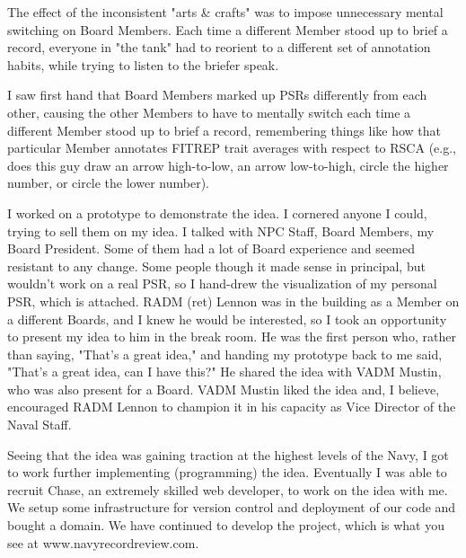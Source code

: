 \documentclass[UTF8]{article}
\begin{document}
The effect of the inconsistent "arts \& crafts" was to impose unnecessary mental 
switching on Board Members. Each time a different Member stood up to brief a record,
everyone in "the tank" had to reorient to a different set of annotation habits, while 
trying to listen to the briefer speak.

I saw first hand that Board Members marked up PSRs differently from each other, causing the other Members to have to mentally switch each time a different Member stood up to brief a record, remembering things like how that particular Member annotates FITREP trait averages with respect to RSCA (e.g., does this guy draw an arrow high-to-low, an arrow low-to-high, circle the higher number, or circle the lower number). 

I worked on a prototype to demonstrate the idea. I cornered anyone I could, trying to sell them on my idea. I talked with NPC Staff, Board Members, my Board President. Some of them had a lot of Board experience and seemed resistant to any change. Some people though it made sense in principal, but wouldn't work on a real PSR, so I hand-drew the visualization of my personal PSR, which is attached. RADM (ret) Lennon was in the building as a Member on a different Boards, and I knew he would be interested, so I took an opportunity to present my idea to him in the break room. He was the first person who, rather than saying, "That's a great idea," and handing my prototype back to me said, "That's a great idea, can I have this?" He shared the idea with VADM Mustin, who was also present for a Board. VADM Mustin liked the idea and, I believe, encouraged RADM Lennon to champion it in his capacity as Vice Director of the Naval Staff.

Seeing that the idea was gaining traction at the highest levels of the Navy, I got to work further implementing (programming) the idea. Eventually I was able to recruit Chase, an extremely skilled web developer, to work on the idea with me. We setup some infrastructure for version control and deployment of our code and bought a domain. We have continued to develop the project, which is what you see at www.navyrecordreview.com.
\end{document}
